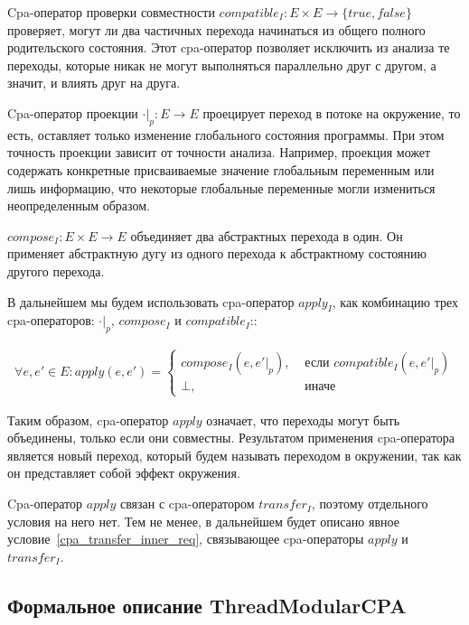 Cpa-оператор проверки совместности $compatible_I: E \times E \rightarrow \{true, false\}$ проверяет, могут ли два частичных перехода начинаться из общего полного родительского состояния. 
Этот cpa-оператор позволяет исключить из анализа те переходы, которые никак не могут выполняться параллельно друг с другом, а значит, и влиять друг на друга.

Cpa-оператор проекции $\cdot|_p: E \rightarrow E$ проецирует переход в потоке на окружение, то есть, оставляет только изменение глобального состояния программы. 
При этом точность проекции зависит от точности анализа.
Например, проекция может содержать конкретные присваиваемые значение глобальным переменным или лишь информацию, что некоторые глобальные переменные могли измениться неопределенным образом. 

$compose_I: E \times E \rightarrow E$ объединяет два абстрактных перехода в один. Он применяет абстрактную дугу из одного перехода к абстрактному состоянию другого перехода. 

В дальнейшем мы будем использовать cpa-оператор $apply_I$, как комбинацию трех cpa-операторов: $\cdot|_p$, $compose_I$ и $compatible_I$::

\begin{equation}
\label{apply_function}
\begin{aligned}
\forall e, e' \in E: apply(e, e') = 
\begin{cases}
compose_{I}(e, e'|_p), &\mbox{ если } compatible_I(e, e'|_p) \\
\bot, & \mbox{ иначе}
\end{cases}
\end{aligned}
\end{equation}

Таким образом, cpa-оператор $apply$ означает, что переходы могут быть объединены, только если они совместны. Результатом применения cpa-оператора является новый переход, который будем называть переходом в окружении, так как он представляет собой эффект окружения.

Cpa-оператор $apply$ связан с cpa-оператором $transfer_I$, поэтому отдельного условия на него нет.
Тем не менее, в дальнейшем будет описано явное условие~\ref{cpa_transfer_inner_req}, связывающее cpa-операторы $apply$ и $transfer_I$.


\subsection{Формальное описание ThreadModularCPA}

